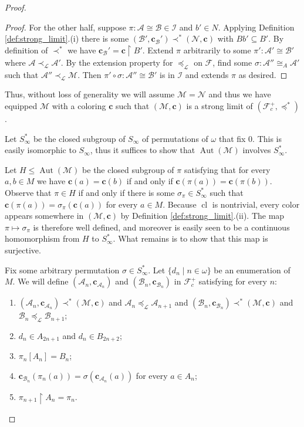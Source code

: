\documentclass[12pt]{amsart}
\theoremstyle{plain}
\theoremstyle{definition}
\newcommand{\isom}{\cong}
\newcommand{\mcA}{\mathcal{A}}
\newcommand{\mcB}{\mathcal{B}}
\newcommand{\mcF}{\mathcal{F}}
\newcommand{\mcI}{\mathcal{I}}
\newcommand{\mcL}{\mathcal{L}}
\newcommand{\mcM}{\mathcal{M}}
\newcommand{\mcN}{\mathcal{N}}
\newcommand{\oc}{\mathbf{c}}
\DeclareMathOperator{\Aut}{Aut}
\DeclareMathOperator{\cl}{cl}
\begin{document}
\begin{proof}
\begin{proof}
For the other half, suppose $\pi : \mcA \isom \mcB \in \mcI$ and $b' \in N$.
Applying Definition \ref{def:strong_limit}.(i) there is some $(\mcB', \oc_\mcB') \prec^* (\mcN, \oc)$ with $Bb' \subseteq B'$.
By definition of $\prec^*$ we have $\oc_\mcB' = \oc \upharpoonright B'$.
Extend $\pi$ arbitrarily to some $\pi' : \mcA' \isom \mcB'$ where $\mcA \prec_\mcL \mcA'$.
By the extension property for $\preceq_\mcL$ on $\mcF$, find some $\sigma : \mcA'' \isom_A \mcA'$ such that $\mcA'' \prec_\mcL \mcM$.
Then $\pi' \circ \sigma : \mcA'' \isom \mcB'$ is in $\mcI$ and extends $\pi$ as desired.
\end{proof}

Thus, without loss of generality we will assume $\mcM = \mcN$ and thus we have equipped $\mcM$ with a coloring $\oc$ such that $(\mcM, \oc)$ is a strong limit of $(\mcF^+_c, \preceq^*)$.

Let $S_\infty^*$ be the closed subgroup of $S_\infty$ of permutations of $\omega$ that fix 0.
This is easily isomorphic to $S_\infty$, thus it suffices to show that $\Aut(\mcM)$ involves $S_\infty^*$.

Let $H \le \Aut(\mcM)$ be the closed subgroup of $\pi$ satisfying that for every $a, b \in M$ we have $\oc(a) = \oc(b)$ if and only if $\oc(\pi(a)) = \oc(\pi(b))$.
Observe that $\pi \in H$ if and only if there is some $\sigma_\pi \in S^*_\infty$ such that $\oc(\pi(a)) = \sigma_\pi(\oc(a))$ for every $a \in M$.
Because $\cl$ is nontrivial, every color appears somewhere in $(\mcM, \oc)$ by Definition \ref{def:strong_limit}.(ii).
The map $\pi \mapsto \sigma_\pi$ is therefore well defined, and moreover is easily seen to be a continuous homomorphism from $H$ to $S_\infty^*$.
What remains is to show that this map is surjective.

Fix some arbitrary permutation $\sigma \in S_\infty^*$.
Let $\{d_n \mid n \in \omega\}$ be an enumeration of $M$.
We will define $(\mcA_n, \oc_{\mcA_n})$ and $(\mcB_n, \oc_{\mcB_n})$ in $\mcF^+_c$ satisfying for every $n$:
\begin{enumerate}
    \item $(\mcA_n, \oc_{\mcA_n}) \prec^* (\mcM, \oc)$ and $\mcA_n \preceq_\mcL \mcA_{n+1}$ and $(\mcB_n, \oc_{\mcB_n}) \prec^* (\mcM, \oc)$ and $\mcB_n \preceq_\mcL \mcB_{n+1}$;
    \item $d_n \in A_{2n+1}$ and $d_n \in B_{2n+2}$;
    \item $\pi_n[A_n] = B_n$;
    \item $\oc_{\mcB_n}(\pi_n(a)) = \sigma(\oc_{\mcA_n}(a))$ for every $a \in A_n$;
    \item $\pi_{n+1} \upharpoonright A_n = \pi_n$. 
\end{enumerate}


\end{proof}
\end{document}
